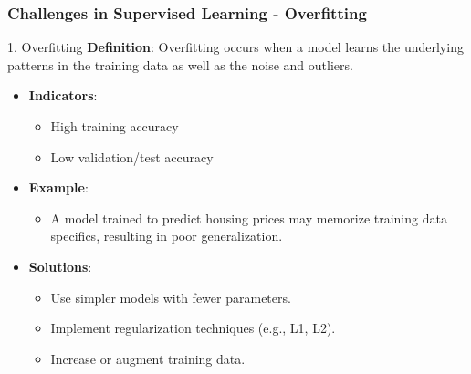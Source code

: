 \documentclass[aspectratio=169]{beamer}
\begin{document}
\begin{frame}[fragile]
    \frametitle{Challenges in Supervised Learning - Overfitting}
    \begin{block}{1. Overfitting}
        \textbf{Definition}: Overfitting occurs when a model learns the underlying patterns in the training data as well as the noise and outliers. 
    \end{block}
    \begin{itemize}
        \item \textbf{Indicators}:
        \begin{itemize}
            \item High training accuracy
            \item Low validation/test accuracy
        \end{itemize}
        \item \textbf{Example}:
        \begin{itemize}
            \item A model trained to predict housing prices may memorize training data specifics, resulting in poor generalization.
        \end{itemize}
        \item \textbf{Solutions}:
        \begin{itemize}
            \item Use simpler models with fewer parameters.
            \item Implement regularization techniques (e.g., L1, L2).
            \item Increase or augment training data.
        \end{itemize}
    \end{itemize}
\end{frame}
\end{document}
